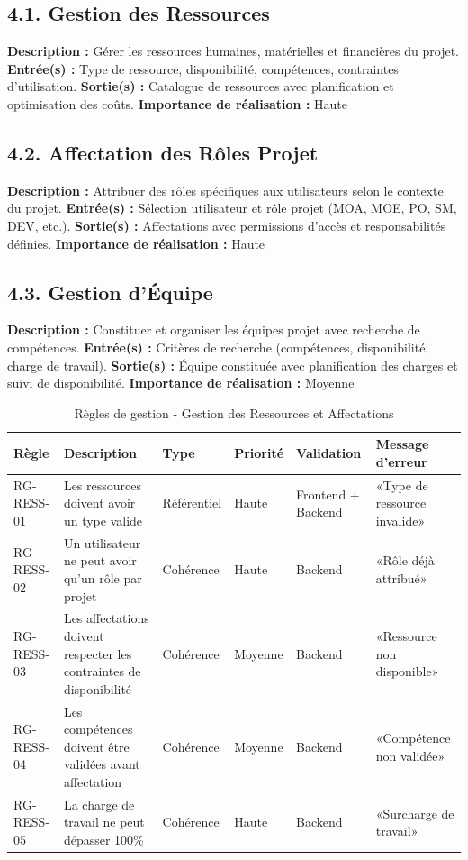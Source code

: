 \subsection{4.1. Gestion des Ressources}
\textbf{Description :} Gérer les ressources humaines, matérielles et financières du projet.
\textbf{Entrée(s) :} Type de ressource, disponibilité, compétences, contraintes d'utilisation.
\textbf{Sortie(s) :} Catalogue de ressources avec planification et optimisation des coûts.
\textbf{Importance de réalisation :} Haute

\subsection{4.2. Affectation des Rôles Projet}
\textbf{Description :} Attribuer des rôles spécifiques aux utilisateurs selon le contexte du projet.
\textbf{Entrée(s) :} Sélection utilisateur et rôle projet (MOA, MOE, PO, SM, DEV, etc.).
\textbf{Sortie(s) :} Affectations avec permissions d'accès et responsabilités définies.
\textbf{Importance de réalisation :} Haute

\subsection{4.3. Gestion d'Équipe}
\textbf{Description :} Constituer et organiser les équipes projet avec recherche de compétences.
\textbf{Entrée(s) :} Critères de recherche (compétences, disponibilité, charge de travail).
\textbf{Sortie(s) :} Équipe constituée avec planification des charges et suivi de disponibilité.
\textbf{Importance de réalisation :} Moyenne

\begin{table}[H]
\centering
\footnotesize
\begin{tabular}{|p{1.5cm}|p{3.5cm}|p{1.5cm}|p{1.5cm}|p{2cm}|p{2.5cm}|}
\hline
\textbf{Règle} & \textbf{Description} & \textbf{Type} & \textbf{Priorité} & \textbf{Validation} & \textbf{Message d'erreur} \\
\hline
RG-RESS-01 & Les ressources doivent avoir un type valide & Référentiel & Haute & Frontend + Backend & «Type de ressource invalide» \\
\hline
RG-RESS-02 & Un utilisateur ne peut avoir qu'un rôle par projet & Cohérence & Haute & Backend & «Rôle déjà attribué» \\
\hline
RG-RESS-03 & Les affectations doivent respecter les contraintes de disponibilité & Cohérence & Moyenne & Backend & «Ressource non disponible» \\
\hline
RG-RESS-04 & Les compétences doivent être validées avant affectation & Cohérence & Moyenne & Backend & «Compétence non validée» \\
\hline
RG-RESS-05 & La charge de travail ne peut dépasser 100\% & Cohérence & Haute & Backend & «Surcharge de travail» \\
\hline
\end{tabular}
\caption{Règles de gestion - Gestion des Ressources et Affectations}
\label{tab:rg_ressources}
\end{table}

